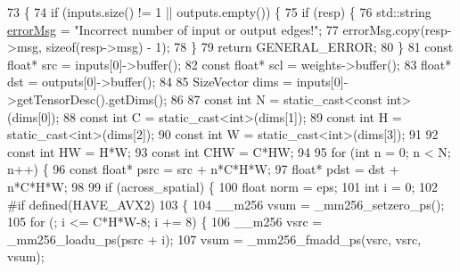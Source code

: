 \begin{DoxyCode}
73                                                              \{
74         \textcolor{keywordflow}{if} (inputs.size() != 1 || outputs.empty()) \{
75             \textcolor{keywordflow}{if} (resp) \{
76                 std::string \hyperlink{classInferenceEngine_1_1Extensions_1_1Cpu_1_1ExtLayerBase_abc78e9b5a79fa339ffd831a5318f71f7}{errorMsg} = \textcolor{stringliteral}{"Incorrect number of input or output edges!"};
77                 errorMsg.copy(resp->msg, \textcolor{keyword}{sizeof}(resp->msg) - 1);
78             \}
79             \textcolor{keywordflow}{return} GENERAL\_ERROR;
80         \}
81         \textcolor{keyword}{const} \textcolor{keywordtype}{float}* src = inputs[0]->buffer();
82         \textcolor{keyword}{const} \textcolor{keywordtype}{float}* scl = weights->buffer();
83         \textcolor{keywordtype}{float}* dst = outputs[0]->buffer();
84 
85         SizeVector dims = inputs[0]->getTensorDesc().getDims();
86 
87         \textcolor{keyword}{const} \textcolor{keywordtype}{int} N = \textcolor{keyword}{static\_cast<}\textcolor{keyword}{const }\textcolor{keywordtype}{int}\textcolor{keyword}{>}(dims[0]);
88         \textcolor{keyword}{const} \textcolor{keywordtype}{int} C = \textcolor{keyword}{static\_cast<}\textcolor{keywordtype}{int}\textcolor{keyword}{>}(dims[1]);
89         \textcolor{keyword}{const} \textcolor{keywordtype}{int} H = \textcolor{keyword}{static\_cast<}\textcolor{keywordtype}{int}\textcolor{keyword}{>}(dims[2]);
90         \textcolor{keyword}{const} \textcolor{keywordtype}{int} W = \textcolor{keyword}{static\_cast<}\textcolor{keywordtype}{int}\textcolor{keyword}{>}(dims[3]);
91 
92         \textcolor{keyword}{const} \textcolor{keywordtype}{int} HW = H*W;
93         \textcolor{keyword}{const} \textcolor{keywordtype}{int} CHW = C*HW;
94 
95         \textcolor{keywordflow}{for} (\textcolor{keywordtype}{int} n = 0; n < N; n++) \{
96             \textcolor{keyword}{const} \textcolor{keywordtype}{float}* psrc = src + n*C*H*W;
97             \textcolor{keywordtype}{float}* pdst = dst + n*C*H*W;
98 
99             \textcolor{keywordflow}{if} (across\_spatial) \{
100                 \textcolor{keywordtype}{float} norm = eps;
101                 \textcolor{keywordtype}{int} i = 0;
102 \textcolor{preprocessor}{#if defined(HAVE\_AVX2)}
103                 \{
104                     \_\_m256 vsum = \_mm256\_setzero\_ps();
105                     \textcolor{keywordflow}{for} (; i <= C*H*W-8; i += 8) \{
106                         \_\_m256 vsrc = \_mm256\_loadu\_ps(psrc + i);
107                         vsum = \_mm256\_fmadd\_ps(vsrc, vsrc, vsum);

\end{DoxyCode}
